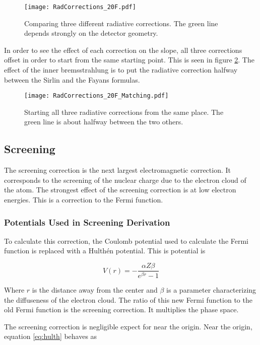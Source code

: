 \documentclass[../MaxHughesThesis.tex]{subfiles}
\begin{document}
\begin{figure}[!htb]
	\centerline{\texttt{[image: RadCorrections\_20F.pdf]}}
	\caption{Comparing three different radiative corrections.
		 The green line depends strongly on the detector geometry.
		 }
	\label{fig:rad}
\end{figure}

In order to see the effect of each correction on the slope, all three corrections offset in order to start from the same starting point.
This is seen in figure \ref{fig:radmatch}.
The effect of the inner bremsstrahlung is to put the radiative correction halfway between the Sirlin and the Fayans formulas.

\begin{figure}[!htb]
	\centerline{\texttt{[image: RadCorrections\_20F\_Matching.pdf]}}
	\caption{Starting all three radiative corrections from the same place.	
		 The green line is about halfway between the two others.}
	\label{fig:radmatch}
\end{figure}

\subsection{Screening}
The screening correction is the next largest electromagnetic correction.
It corresponds to the screening of the nuclear charge due to the electron cloud of the atom.
The strongest effect of the screening correction is at low electron energies.
This is a correction to the Fermi function.

\subsubsection{Potentials Used in Screening Derivation}
To calculate this correction, the Coulomb potential used to calculate the Fermi function is replaced with a Hulth\'en potential.
This is potential is %

\begin{equation}
	V(r) = -\frac{\alpha Z \beta}{e^{\beta r} - 1}
	\label{eq:hulth}
\end{equation}

Where $r$ is the distance away from the center and $\beta$ is a parameter characterizing the diffuseness of the electron cloud.
The ratio of this new Fermi function to the old Fermi function is the screening correction.
It multiplies the phase space. 

The screening correction is negligible expect for near the origin.
Near the origin, equation \ref{eq:hulth} behaves as %
\end{document}
